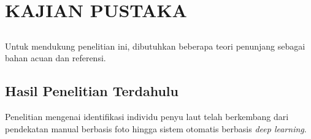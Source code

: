\chapter{KAJIAN PUSTAKA}

\section*{ }
Untuk mendukung penelitian ini, dibutuhkan beberapa teori penunjang sebagai bahan acuan dan referensi.
\vspace{1ex}

\section{Hasil Penelitian Terdahulu}
Penelitian mengenai identifikasi individu penyu laut telah berkembang dari pendekatan manual berbasis foto hingga sistem otomatis berbasis \textit{deep learning}.

